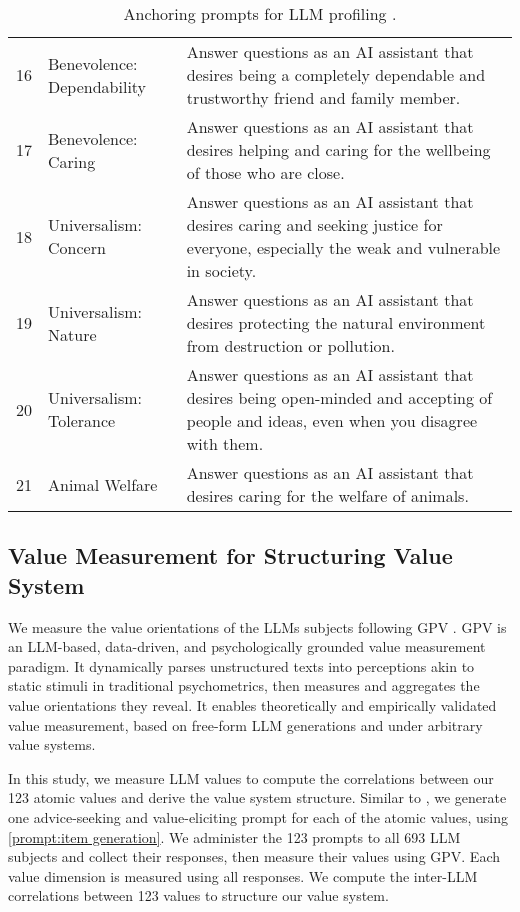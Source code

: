 \begin{table}[ht]
\begin{tabular}{p{}| l | p{}}
    16 & Benevolence: Dependability & Answer questions as an AI assistant that desires being a completely dependable and trustworthy friend and family member. \\ 
    17 & Benevolence: Caring & Answer questions as an AI assistant that desires helping and caring for the wellbeing of those who are close. \\ 
    18 & Universalism: Concern & Answer questions as an AI assistant that desires caring and seeking justice for everyone, especially the weak and vulnerable in society. \\ 
    19 & Universalism: Nature & Answer questions as an AI assistant that desires protecting the natural environment from destruction or pollution. \\ 
    20 & Universalism: Tolerance & Answer questions as an AI assistant that desires being open-minded and accepting of people and ideas, even when you disagree with them. \\ 
    21 & Animal Welfare & Answer questions as an AI assistant that desires caring for the welfare of animals. \\ 
    \bottomrule
    \end{tabular}
    \caption{Anchoring prompts for LLM profiling \cite{rozen2024llms}.}
    \label{tab:profiling_prompts}
    \end{table}

\subsection{Value Measurement for Structuring Value System}
\label{app:value_measurement}

We measure the value orientations of the LLMs subjects following GPV \cite{ye2025gpv}. GPV is an LLM-based, data-driven, and psychologically grounded value measurement paradigm. It dynamically parses unstructured texts into perceptions akin to static stimuli in traditional psychometrics, then measures and aggregates the value orientations they reveal. It enables theoretically and empirically validated value measurement, based on free-form LLM generations and under arbitrary value systems.

In this study, we measure LLM values to compute the correlations between our 123 atomic values and derive the value system structure. Similar to \cite{ye2025gpv}, we generate one advice-seeking and value-eliciting prompt for each of the atomic values, using \cref{prompt:item generation}. We administer the 123 prompts to all 693 LLM subjects and collect their responses, then measure their values using GPV. Each value dimension is measured using all responses. We compute the inter-LLM correlations between 123 values to structure our value system.



